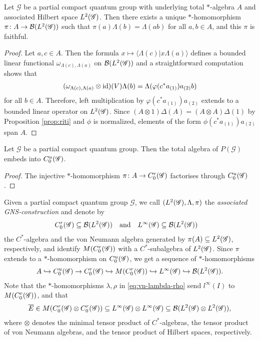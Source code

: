 \begin{Prop} \label{prop:gns} Let $\mathscr{G}$ be a partial compact quantum group with
  underlying total $*$-algebra $A$ and associated Hilbert
  space $L^{2}(\mathscr{G})$. Then there exists a unique $*$-homomorphism $\pi\colon
  A \to {\cal B}(L^{2}(\mathscr{G}))$ such that $\pi(a)\Lambda(b)=\Lambda(ab)$ for
  all $a,b\in A$, and this $\pi$ is faithful.
\end{Prop}
\begin{proof} 
  Let $a,c \in A$. Then the formula $x \mapsto \langle
\Lambda(c) | x\Lambda(a)\rangle$ defines a bounded linear functional
  $\omega_{\Lambda(c),\Lambda(a)}$ on ${\cal B}(L^{2}(\mathscr{G}))$ and a
  straightforward computation shows that
  \begin{align*}
    (\omega_{\Lambda(c),\Lambda(a)}\otimes \operatorname{id})(V)\Lambda(b) =
    \Lambda(\varphi(c^*a_{(1)})a_{(2)}b)
  \end{align*}
  for all $b\in A$. Therefore, left multiplication by
  $\varphi(c^*a_{(1)})a_{(2)}$ extends to a bounded linear operator on $L^{2}(\mathscr{G})$.
 Since $(A\otimes 1)\Delta(A) = (A\otimes
  A)\Delta(1)$ by Proposition \ref{prop:riti} and $\phi$ is
  normalized,  elements of the form $\phi(c^{*}a_{(1)})a_{(2)}$ span
  $A$. 
\end{proof}
\begin{Cor}
  Let $\mathscr{G}$ be a partial compact quantum group. Then the total
  algebra of $P(\mathscr{G})$ embeds into $C^{u}_{0}(\mathscr{G})$.
\end{Cor}
\begin{proof}
  The injective  $*$-homomorphism  $\pi\colon A \to C^{r}_{0}(\mathscr{G})$ 
  factorises through $C^{u}_{0}(\mathscr{G})$.
\end{proof}
Given a partial compact quantum group $\mathscr{G}$, we call
$(L^{2}(\mathscr{G}),\Lambda,\pi)$ the \emph{associated GNS-construction} and denote by
\begin{align}
  C^{r}_{0}(\mathscr{G}) &\subseteq {\cal B}(L^{2}(\mathscr{G})) &&\text{and} & L^{\infty}(\mathscr{G}) &\subseteq {\cal B}(L^{2}(\mathscr{G}))
\end{align}
the $C^{*}$-algebra and the von Neumann algebra generated by $\pi(A)
\subseteq L^{2}(\mathscr{G})$, respectively, and identify $M(C^{r}_{0}(\mathscr{G}))$ with a
$C^{*}$-subalgebra of $L^{2}(\mathscr{G})$.  Since $\pi$ extends to a
$*$-homomorphism on $C^{u}_{0}(\mathscr{G})$, we get a sequence of $*$-homomorphisms
\begin{align*}
A \hookrightarrow C^{u}_{0}(\mathscr{G}) \to 
  C^{r}_{0}(\mathscr{G}) \hookrightarrow M(C^{r}_{0}(\mathscr{G})) \hookrightarrow
L^{\infty}(\mathscr{G}) \hookrightarrow {\cal B}(L^{2}(\mathscr{G})).
\end{align*}
Note that
 the $*$-homomorphisms $\lambda,\rho$ in
\eqref{eq:vn-lambda-rho} send $l^{\infty}(I)$ to $M(C^{r}_{0}(\mathscr{G}))$, and that
\begin{align*}
  \overline{E} \in M(C^{r}_{0}(\mathscr{G}) \otimes C^{r}_{0}(\mathscr{G})) \subseteq L^{\infty}(\mathscr{G}) \otimes L^{\infty}(\mathscr{G})
  \subseteq {\cal B}(L^{2}(\mathscr{G}) \otimes L^{2}(\mathscr{G})),
\end{align*}
where $\otimes$ denotes the minimal tensor product
of $C^{*}$-algebras, the tensor product of von Neumann algebras, and
the tensor product of Hilbert spaces, respectively.


